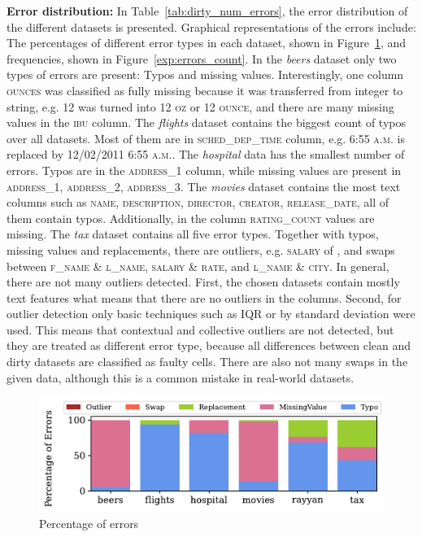 \textbf{Error distribution: } 
In Table~\ref{tab:dirty_num_errors}, the error distribution of the different datasets is presented. 
Graphical representations of the errors include: The percentages of different error types in each dataset, shown in Figure~\ref{exp:errors_percent}, and frequencies, shown in Figure~\ref{exp:errors_count}.
In the \textit{beers} dataset only two types of errors are present: Typos and missing values. 
Interestingly, one column \textsc{ounces} was classified as fully missing because it was transferred from integer to string, e.g. \textsc{12} was turned into \textsc{12 oz} or \textsc{12 ounce}, and there are many missing values in the \textsc{ibu} column.
The \textit{flights} dataset contains the biggest count of typos over all  datasets. 
Most of them are in \textsc{sched\_dep\_time} column, e.g. \textsc{6:55 a.m.} is replaced by \textsc{12/02/2011 6:55 a.m.}.
The \textit{hospital} data has the smallest number of errors. 
Typos are in the \textsc{address\_1} column, while missing values are present in \textsc{address\_1}, \textsc{address\_2}, \textsc{address\_3}.
The \textit{movies} dataset contains the most text columns such as \textsc{name}, \textsc{description}, \textsc{director}, \textsc{creator}, \textsc{release\_date}, all of them contain typos. Additionally, in the column \textsc{rating\_count}  values are missing.
The \textit{tax} dataset contains all five error types. 
Together with typos, missing values and replacements, there are outliers, e.g. \textsc{salary} of , and swaps between \textsc{f\_name} \& \textsc{l\_name}, \textsc{salary} \& \textsc{rate}, and \textsc{l\_name} \& \textsc{city}. 
In general, there are not many outliers detected.
First, the chosen datasets contain mostly text features what means that there are no outliers in the columns.
Second, for outlier detection only basic techniques such as IQR or by standard deviation were used. 
This means that contextual and collective outliers are not detected, but they are treated as different error type, because all differences between clean and dirty datasets are classified as faulty cells.
There are also not many swaps in the given data, although this is a common mistake in real-world datasets.

\begin{figure}[!t]
    \centering
    \includegraphics[width=\textwidth]{figures/plot/error_percent/errors_percent.pdf}
    \caption{Percentage of errors}
    \label{exp:errors_percent}
\end{figure}

